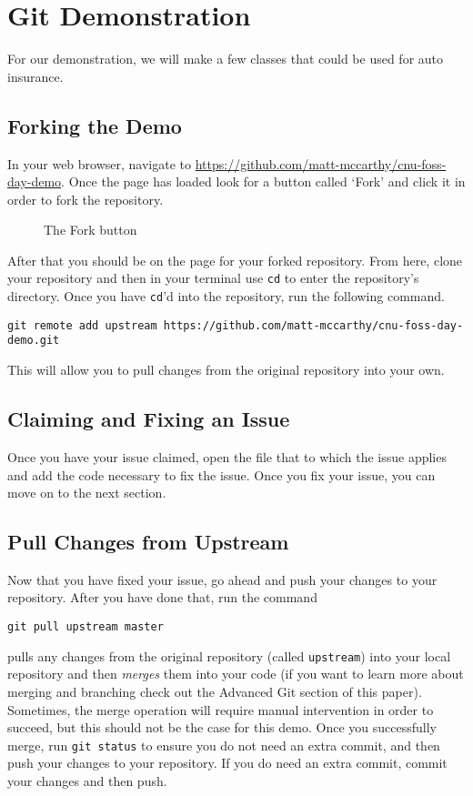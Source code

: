 \documentclass[notitlepage]{simple}
\begin{document}
\section{Git Demonstration}

For our demonstration, we will make a few classes that could be used for auto insurance.

\subsection{Forking the Demo}

In your web browser, navigate to \url{https://github.com/matt-mccarthy/cnu-foss-day-demo}.
Once the page has loaded look for a button called `Fork' and click it in order to fork the repository.
\begin{figure}[H]
	\centering
	\caption{The Fork button}
\end{figure}
After that you should be on the page for your forked repository.
From here, clone your repository and then in your terminal use \verb|cd| to enter the repository's directory.
Once you have \verb|cd|'d into the repository, run the following command.
\begin{terminal}
	\verb|git remote add upstream https://github.com/matt-mccarthy/cnu-foss-day-demo.git|
\end{terminal}
This will allow you to pull changes from the original repository into your own.

\subsection{Claiming and Fixing an Issue}


Once you have your issue claimed, open the file that to which the issue applies and add the code necessary to fix the issue.
Once you fix your issue, you can move on to the next section.

\subsection{Pull Changes from Upstream}

Now that you have fixed your issue, go ahead and push your changes to your repository.
After you have done that, run the command
\begin{terminal}
	\verb|git pull upstream master|
\end{terminal}
pulls any changes from the original repository (called \verb|upstream|) into your local repository and then \textit{merges} them into your code
(if you want to learn more about merging and branching check out the Advanced Git section of this paper).
Sometimes, the merge operation will require manual intervention in order to succeed, but this should not be the case for this demo.
Once you successfully merge, run \verb|git status| to ensure you do not need an extra commit, and then push your changes to your repository.
If you do need an extra commit, commit your changes and then push.
\end{document}
